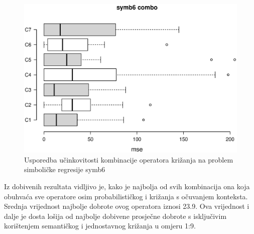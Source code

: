 \begin{figure}[H]
	\centering
	\includegraphics[trim=4cm 4cm 0cm 0cm, scale=0.6]{./slike/boxPlots/symb6-combo.eps}
	\caption{Usporedba učinkovitosti kombinacije operatora križanja na problem simboličke regresije symb6}
	\label{symb6combo}
\end{figure}

Iz dobivenih rezultata vidljivo je, kako je najbolja od svih kombinacija ona koja obuhvaća sve operatore osim probabilističkog i križanja s očuvanjem konteksta. Srednja vrijednost najbolje dobrote ovog operatora iznosi 23.9. Ova vrijednost i dalje je dosta lošija od najbolje dobivene prosječne dobrote s isključivim korištenjem semantičkog i jednostavnog križanja u omjeru 1:9.